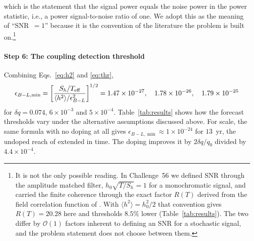 %
which is the statement that the signal power equals the noise power in the power statistic, i.e., a power signal-to-noise ratio of one. We adopt this as the meaning of ``SNR~$=1$'' because it is the convention of the literature the problem is built on.\footnote{It is not the only possible reading. In Challenge~56 we defined SNR through the amplitude matched filter, $h_0\sqrt{T/S_h}=1$ for a monochromatic signal, and carried the finite coherence through the exact factor $R(T)$ derived from the field correlation function of \citet{Derevianko2018}. With $\langle h^2\rangle=h_0^2/2$ that convention gives $R(T)=20.28$ here and thresholds $8.5\%$ lower (Table~\ref{tab:results}). The two differ by $\mathcal O(1)$ factors inherent to defining an SNR for a stochastic signal, and the problem statement does not choose between them.}

\paragraph*{Step 6: The coupling detection threshold}
Combining Eqs.~\eqref{eq:h2} and \eqref{eq:thr},
%
\begin{equation}
\epsilon_{B-L,\min}=\left[\frac{S_h/T_{\rm eff}}{\langle h^2\rangle/\epsilon_{B-L}^2}\right]^{1/2}
=1.47\times10^{-27},\quad 1.78\times10^{-26},\quad 1.79\times10^{-25}
\label{eq:final}
\end{equation}
%
for $\delta q=0.074$, $6\times10^{-3}$ and $5\times10^{-4}$. Table~\ref{tab:results} shows how the forecast thresholds vary under the alternative assumptions discussed above. For scale, the same formula with no doping at all gives $\epsilon_{B-L,\min}\approx1\times10^{-24}$ for $13$~yr, the undoped reach of \citet{Morisaki2021} extended in time. The doping improves it by $2\delta q/q_0$ divided by $4.4\times10^{-4}$.

